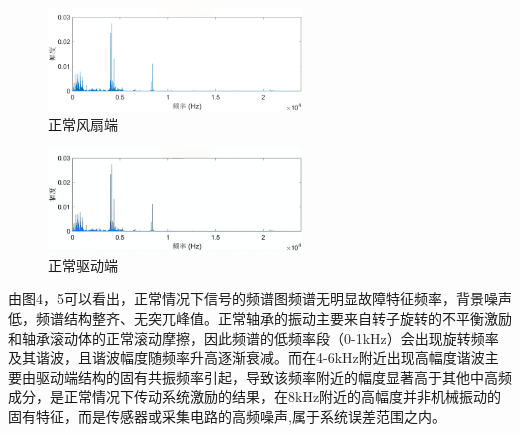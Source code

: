 \documentclass[a4paper]{CPIPC}
\numberwithin{equation}{section}
\begin{document}
\begin{figure}[H]
  \centering
  \includegraphics[width=0.6\textwidth]{正常风扇端.png}
  \caption{正常风扇端}
  \label{fig:confidence}
\end{figure}
\begin{figure}[H]
  \centering
  \includegraphics[width=0.6\textwidth]{正常驱动端.png}
  \caption{正常驱动端}
  \label{fig:confidence}
\end{figure}

由图4，5可以看出，正常情况下信号的频谱图频谱无明显故障特征频率，背景噪声低，频谱结构整齐、无突兀峰值。正常轴承的振动主要来自转子旋转的不平衡激励和轴承滚动体的正常滚动摩擦，因此频谱的低频率段（0-1kHz）会出现旋转频率及其谐波，且谐波幅度随频率升高逐渐衰减。而在4-6kHz附近出现高幅度谐波主要由驱动端结构的固有共振频率引起，导致该频率附近的幅度显著高于其他中高频成分，是正常情况下传动系统激励的结果，在8kHz附近的高幅度并非机械振动的固有特征，而是传感器或采集电路的高频噪声,属于系统误差范围之内。
\end{document}
